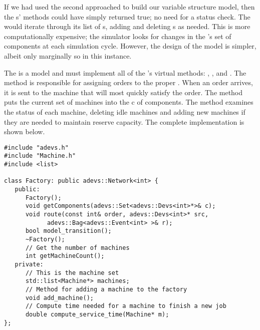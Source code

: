 If we had used the second approached to build our variable structure model, then the s'  methods could have simply returned true; no need for a status check. The  would iterate through its list of s, adding and deleting s as needed. This is more computationally expensive; the simulator looks for changes in the 's set of components at each simulation cycle. However, the design of the model is simpler, albeit only marginally so in this instance.

The  is a  model and must implement all of the 's virtual methods: , , and . The  method is responsible for assigning orders to the proper . When an order arrives, it is sent to the machine that will most quickly satisfy the order. The  method puts the current set of machines into the  c of components. The  method examines the status of each machine, deleting idle machines and adding new machines if they are needed to maintain reserve capacity. The complete  implementation is shown below.
\begin{verbatim}
#include "adevs.h"
#include "Machine.h"
#include <list>

class Factory: public adevs::Network<int> {
   public:
      Factory();
      void getComponents(adevs::Set<adevs::Devs<int>*>& c);
      void route(const int& order, adevs::Devs<int>* src,
            adevs::Bag<adevs::Event<int> >& r);
      bool model_transition();
      ~Factory();
      // Get the number of machines
      int getMachineCount();
   private:
      // This is the machine set
      std::list<Machine*> machines;
      // Method for adding a machine to the factory
      void add_machine();
      // Compute time needed for a machine to finish a new job
      double compute_service_time(Machine* m);
};
\end{verbatim}
